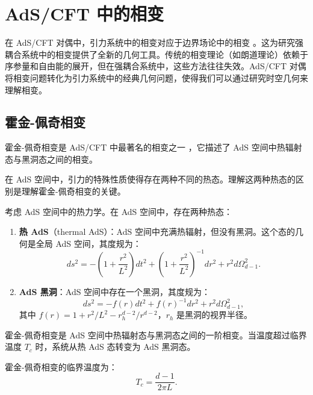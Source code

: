 \section{AdS/CFT 中的相变}

在 AdS/CFT 对偶中，引力系统中的相变对应于边界场论中的相变 \cite{Witten1998b}。这为研究强耦合系统中的相变提供了全新的几何工具。传统的相变理论（如朗道理论）依赖于序参量和自由能的展开，但在强耦合系统中，这些方法往往失效。AdS/CFT 对偶将相变问题转化为引力系统中的经典几何问题，使得我们可以通过研究时空几何来理解相变。

\subsection{霍金-佩奇相变}

霍金-佩奇相变是 AdS/CFT 中最著名的相变之一 \cite{Hawking1983}，它描述了 AdS 空间中热辐射态与黑洞态之间的相变。

\begin{note}
在 AdS 空间中，引力的特殊性质使得存在两种不同的热态。理解这两种热态的区别是理解霍金-佩奇相变的关键。
\end{note}

考虑 AdS 空间中的热力学。在 AdS 空间中，存在两种热态：
\begin{enumerate}
    \item \textbf{热 AdS}（thermal AdS）：AdS 空间中充满热辐射，但没有黑洞。这个态的几何是全局 AdS 空间，其度规为：
    \begin{equation}
        ds^2 = -\left(1 + \frac{r^2}{L^2}\right)dt^2 + \left(1 + \frac{r^2}{L^2}\right)^{-1}dr^2 + r^2 d\Omega_{d-1}^2.
    \end{equation}
    \item \textbf{AdS 黑洞}：AdS 空间中存在一个黑洞，其度规为：
    \begin{equation}
        ds^2 = -f(r)dt^2 + f(r)^{-1}dr^2 + r^2 d\Omega_{d-1}^2,
    \end{equation}
    其中 $f(r) = 1 + r^2/L^2 - r_h^{d-2}/r^{d-2}$，$r_h$ 是黑洞的视界半径。
\end{enumerate}

\begin{definition}[霍金-佩奇相变]
霍金-佩奇相变是 AdS 空间中热辐射态与黑洞态之间的一阶相变。当温度超过临界温度 $T_c$ 时，系统从热 AdS 态转变为 AdS 黑洞态。
\end{definition}

\begin{theorem}[霍金-佩奇相变的临界温度]
霍金-佩奇相变的临界温度为：
\begin{equation}
    T_c = \frac{d-1}{2\pi L}.
\end{equation}
\end{theorem}

